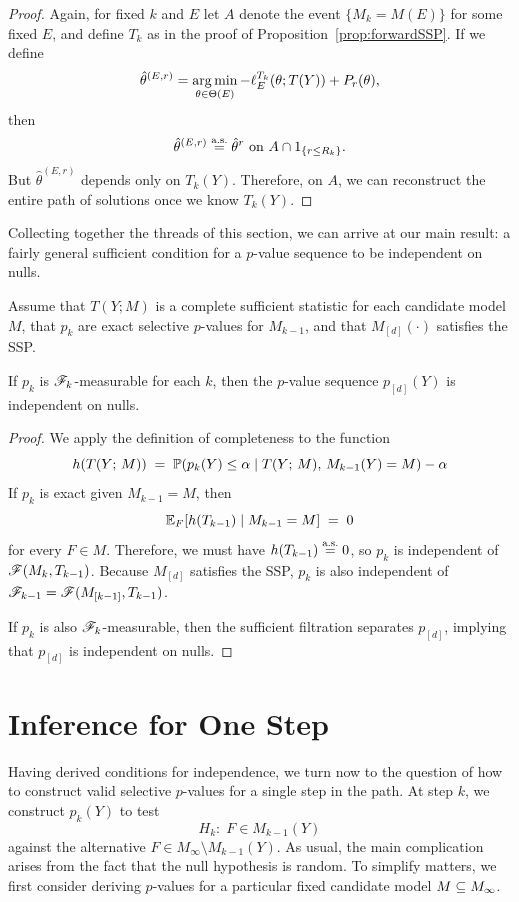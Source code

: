 \documentclass{article}
\begin{document}
\begin{proof}
  Again, for fixed $k$ and $E$ let $A$ denote the event $\{M_k = M(E)\}$ for some fixed $E$, and define $T_k$ as in the proof of Proposition~\ref{prop:forwardSSP}. If we define
\[
\hat\theta^{(E,r)} = \argmin_{\theta\in\Theta(E)} -\ell_E^{T_k}(\theta; T(Y)) + P_r(\theta),
\]
then 
\[
\hat\theta^{(E,r)} \eqAS \hat\theta^{r} \text{ on } 
A \cap 1_{\{r \leq R_k\}}.
\]
But $\hat\theta^{(E,r)}$ depends only on $T_k(Y)$. Therefore, on $A$, we can reconstruct the entire path of solutions once we know $T_k(Y)$.
\end{proof}

Collecting together the threads of this section, we can arrive at our main result: a fairly general sufficient condition for a $p$-value sequence to be independent on nulls.
\begin{theorem} \label{thm:suffCond}
Assume that $T(Y; M)$ is a complete sufficient statistic for each candidate model $M$, that $p_k$ are exact selective $p$-values for $M_{k-1}$, and that $M_{[d]}(\cdot)$ satisfies the SSP.

If $p_k$ is $\sF_k$-measurable for each $k$, then the $p$-value sequence $p_{[d]}(Y)$ is independent on nulls.
\end{theorem}

\begin{proof}
We apply the definition of completeness to the function 
\[
h(T(Y; \, M)) \;=\; 
\P(p_k(Y) \leq \alpha \mid T(Y; \, M), \, M_{k-1}(Y) = M) - \alpha
\]
If $p_k$ is exact given $M_{k-1} = M$, then 
\[
\E_F[h(T_{k-1}) \mid M_{k-1}=M] \;=\; 0
\] 
for every $F\in M$. Therefore, we must have $h(T_{k-1})\eqAS 0$, so $p_k$ is independent of $\sF(M_k, T_{k-1})$. Because $M_{[d]}$ satisfies the SSP, $p_k$ is also independent of $\sF_{k-1} = \sF(M_{[k-1]}, T_{k-1})$.

If $p_k$ is also $\sF_k$-measurable, then the sufficient filtration separates $p_{[d]}$, implying that $p_{[d]}$ is independent on nulls.
\end{proof}

\section{Inference for One Step}\label{sec:singleStep}

Having derived conditions for independence, we turn now to the question of how to construct valid selective $p$-values for a single step in the path. At step $k$, we construct $p_k(Y)$ to test
\[
  H_{k}:\; F \in M_{k-1}(Y)
\]
against the alternative $F \in M_\infty \setminus M_{k-1}(Y)$. As usual, the main complication arises from the fact that the null hypothesis is random. To simplify matters, we first consider deriving $p$-values for a particular fixed candidate model $M\sub M_{\infty}$.
\end{document}
